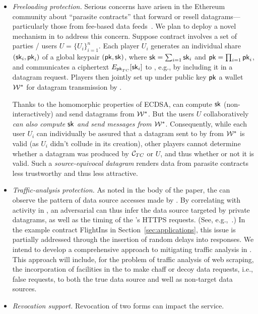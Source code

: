 \begin{itemize}
\item{\em Freeloading protection.} Serious concerns have  arisen in the Ethereum community about ``parasite contracts'' that forward or resell datagrams---particularly those from fee-based data feeds~\cite{parasite}. We plan to deploy a novel mechanism in \tc to address this concern. Suppose contract \reqcont involves a set of parties / users $U = \{U_i\}_{i=1}^n$. Each player $U_i$ generates an individual share $({\sf sk}_i, {\sf pk}_i)$ of a global keypair $({\sf pk}, {\sf sk})$, where ${\sf sk} = \sum_{i=1} {\sf sk}_i$ and ${\sf pk} = \prod_{i=1} {\sf pk}_i$, and communicates a ciphertext $E_{{\sf pk}_{TC}}[{\sf sk}_i]$ to \tcont, e.g., by including it in a datagram request. Players then jointly set  up under public key ${\sf pk}$ a wallet ${\cal W}^*$ for datagram transmission by \tcont. 

Thanks to the homomorphic properties of ECDSA, \tcont can compute ${\sf sk}$ (non-interactively) and send datagrams from ${\cal W}^*$. But the users $U$ collaboratively \emph{can also compute ${\sf sk}$ and send messages from ${\cal W}^*$}. Consequently, while each user $U_i$ can individually be assured that a datagram sent to \reqcont by \tcont from ${\cal W}^*$ is valid (as $U_i$ didn't collude in its creation), other players cannot determine whether a datagram was produced by ${\cal C}_{TC}$ or $U$, and thus whether or not it is valid. Such a \emph{source-equivocal datagram} renders data from parasite contracts less trustworthy and thus less attractive. 
\item{\em Traffic-analysis protection.} As noted in the body of the paper, the \medname can observe the pattern of data source accesses made by \tc. By correlating with activity in \tcont, an adversarial \medname can thus infer the data source targeted by private datagrams, as well as the timing of the \encname's HTTPS requests. (See, e.g.,~\cite{chen2010side}.) In the example contract {\sf FlightIns} in Section~\ref{sec:applications}, this issue is partially addressed through the insertion of random delays into \tc responses. We intend to develop a comprehensive approach to mitigating traffic analysis in \tc. This approach will include, for the problem of traffic analysis of web scraping, the incorporation of facilities in the \encname to make chaff or decoy data requests, i.e., false requests, to both the true data source and well as non-target data sources. 

\item{\em Revocation support.} Revocation of two forms can impact the \tc service. 


\end{itemize}
